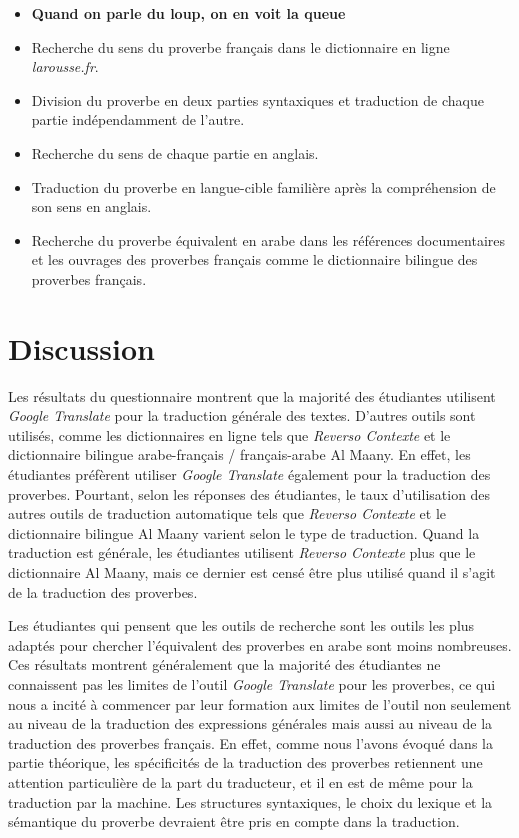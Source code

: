 \documentclass[french]{textolivre}
\begin{document}
\begin{itemize}
   («», wa ma tashaouna 'lla an yasha'a Allaho rab el alameen), ce qui est traduit par 
   («Mais vous ne pouvez vouloir, que si Allah veut, [Lui], le Seigneur de l’Univers»)\footnote{\url{https://surahquran.com/translation/frinsh/586.html}}.
   \item \textbf{Quand on parle du loup, on en voit la queue}
   \item Recherche du sens du proverbe français dans le dictionnaire en ligne \textit{larousse.fr}.
   \item Division du proverbe en deux parties syntaxiques et traduction de chaque partie indépendamment de l’autre.
   \item Recherche du sens de chaque partie en anglais.
   \item Traduction du proverbe en langue-cible familière après la compréhension de son sens en anglais.
   \item Recherche du proverbe équivalent en arabe dans les références documentaires et les ouvrages des proverbes français comme le dictionnaire bilingue des proverbes français.
\end{itemize}

\section{Discussion}\label{sec-autores}
Les résultats du questionnaire montrent que la majorité des étudiantes utilisent \textit{Google Translate} 
pour la traduction générale des textes. D’autres outils sont utilisés, comme les dictionnaires en ligne tels 
que \textit{Reverso Contexte} et le dictionnaire bilingue arabe-français / français-arabe Al Maany. 
En effet, les étudiantes préfèrent utiliser \textit{Google Translate} également pour la traduction des proverbes. 
Pourtant, selon les réponses des étudiantes, le taux d’utilisation des autres outils de traduction automatique tels 
que \textit{Reverso Contexte} et le dictionnaire bilingue Al Maany varient selon le type de traduction. 
Quand la traduction est générale, les étudiantes utilisent \textit{Reverso Contexte} plus que le dictionnaire Al Maany, 
mais ce dernier est censé être plus utilisé quand il s’agit de la traduction des proverbes. 

Les étudiantes qui pensent que les outils de recherche sont les outils les plus adaptés pour chercher l’équivalent 
des proverbes en arabe sont moins nombreuses. Ces résultats montrent généralement que la majorité des étudiantes ne 
connaissent pas les limites de l’outil \textit{Google Translate} pour les proverbes, ce qui nous a incité à commencer par 
leur formation aux limites de l’outil non seulement au niveau de la traduction des expressions générales mais aussi 
au niveau de la traduction des proverbes français. En effet, comme nous l’avons évoqué dans la partie théorique, les 
spécificités de la traduction des proverbes retiennent une attention particulière de la part du traducteur, et il en 
est de même pour la traduction par la machine. Les structures syntaxiques, le choix du lexique et la sémantique du 
proverbe devraient être pris en compte dans la traduction.
\end{document}
